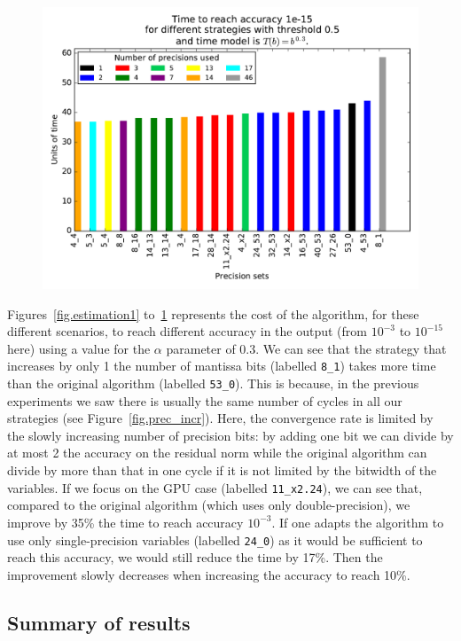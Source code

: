    \begin{figure}
    \includegraphics[width=\linewidth]{figs/cost_15.pdf}
    \caption{}
    \label{fig.estimation5}
   \end{figure}
   
   Figures~\ref{fig.estimation1} to~\ref{fig.estimation5} represents the cost of the algorithm, for these different scenarios, to reach different accuracy in the output (from $10^{-3}$ to $10^{-15}$ here) using
   a value for the $\alpha$ parameter of 0.3. We can see that the strategy that increases by only 1 the number of mantissa bits (labelled \texttt{8\_1}) takes more time than the original algorithm (labelled \texttt{53\_0}). This is because, in the previous experiments we saw
   there is usually the same number of cycles in all our strategies (see Figure~\ref{fig.prec_incr}). Here, the convergence rate is limited by the slowly increasing number of precision bits: by adding one bit we can divide by at most 2 the 
   accuracy on the residual norm while the original algorithm can divide by more than that in one cycle if it is not limited by the bitwidth of the variables.
   If we focus on the GPU case (labelled \texttt{11\_x2.24}), we can see that, compared to the original algorithm (which uses only double-precision), we improve by 35\% the time to reach 
   accuracy $10^{-3}$. If one adapts the algorithm to use only single-precision variables (labelled \texttt{24\_0}) as it would be sufficient to reach this accuracy, we would still reduce the time by 17\%. Then the improvement slowly decreases when increasing the accuracy to reach 10\%.
   
   \subsection{Summary of results}
   
